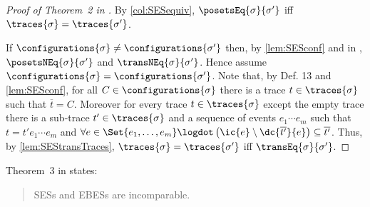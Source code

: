 \documentclass[runningheads,a4paper]{llncs}
\begin{document}
\begin{proof}[Proof of Theorem~2 in \cite{dynamicCausality15}]
	By \cor\ref{col:SESequiv}, $  \posetsEq {\sigma}{\sigma' }$ iff $ \traces{\sigma} = \traces{\sigma'} $.
	
	If $ \configurations{\sigma} \neq \configurations{\sigma'} $ then, by \lem\ref{lem:SESconf} and  in \cite{dynamicCausality15}, $ \posetsNEq{\sigma } {\sigma'} $ and $\transNEq{\sigma}{\sigma'} $. Hence assume $ \configurations{\sigma} = \configurations{\sigma'} $.
	Note that, by Def. 13 and \lem\ref{lem:SESconf}, for all $ C \in \configurations{\sigma} $ there is a trace $ t \in \traces{\sigma} $ such that $ \overline{t} = C $. Moreover for every trace $ t \in \traces{\sigma} $ except the empty trace there is a sub-trace $ t' \in \traces{\sigma} $ and a sequence of events $ e_1 \cdots e_m $ such that $ t = t' e_1 \cdots e_m $ and $ \forall e \in \Set{ e_1, \ldots, e_m } \logdot \left( \ic{e} \setminus \dc{\overline{t'}}{e} \right) \subseteq \overline{t'} $.
	Thus, by \lem\ref{lem:SEStransTraces}, $ \traces{\sigma} = \traces{\sigma'} $ iff $  \transEq {\sigma}{\sigma'}$.
\end{proof}

Theorem~3 in \cite{dynamicCausality15} states:
\begin{quote}
	SESs and EBESs are incomparable.
\end{quote}
\end{document}
